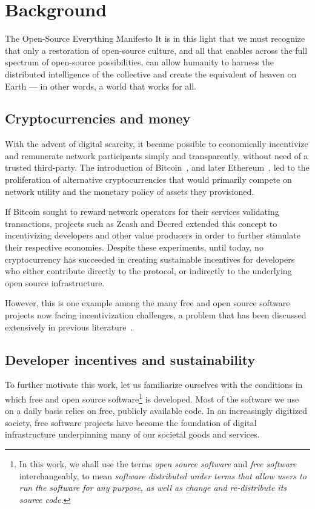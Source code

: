 \section{Background}

\begin{epigraph}{The Open-Source Everything Manifesto}
    \noindent It is in this light that we must recognize that only a restoration of
    open-source culture, and all that enables across the full spectrum of
    open-source possibilities, can allow humanity to harness the distributed
    intelligence of the collective and create the equivalent of heaven on Earth
    --- in other words, a world that works for all.
\end{epigraph}

\subsection{Cryptocurrencies and money}

With the advent of digital scarcity, it became possible to economically
incentivize and remunerate network participants simply and transparently,
without need of a trusted third-party. The introduction of
Bitcoin~\cite{bitcoin}, and later Ethereum~\cite{ethereum}, led to the
proliferation of alternative cryptocurrencies that would primarily compete on
network utility and the monetary policy of assets they provisioned.

If Bitcoin sought to reward network operators for their services validating
transactions, projects such as Zcash and Decred extended this concept to
incentivizing developers and other value producers in order to further stimulate
their respective economies. Despite these experiments, until today, no cryptocurrency
has succeeded in creating sustainable incentives for developers who either
contribute directly to the protocol, or indirectly to the underlying open source
infrastructure.

However, this is one example among the many free and open source software projects
now facing incentivization challenges, a problem that has been
discussed extensively in previous literature~\cite{roads and bridges}.

\subsection{Developer incentives and sustainability}
\label{s:incentives}

To further motivate this work, let us familiarize ourselves with the
conditions in which free and open source software\footnote{In this work, we
shall use the terms \emph{open source software} and \emph{free software} interchangeably,
to mean \emph{software distributed under terms that allow users to run the software
for any purpose, as well as change and re-distribute its source code.}}
is developed. Most of the software we use on a daily basis relies on free,
publicly available code. In an increasingly digitized society, free software
projects have become the foundation of digital infrastructure underpinning many
of our societal goods and services.

